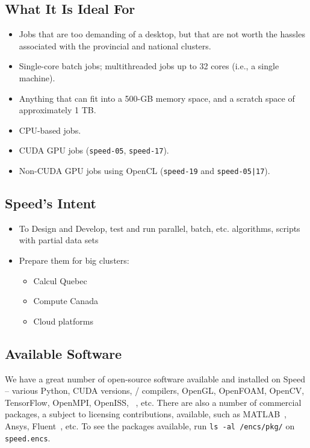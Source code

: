 \documentclass{easychair}
\begin{document}
\subsection{What It Is Ideal For}

\begin{itemize}
\item
Jobs that are too demanding of a desktop, but that are not worth the hassles associated with the provincial and national clusters. 
\item
Single-core batch jobs; multithreaded jobs up to 32 cores (i.e., a single machine).
\item
Anything that can fit into a 500-GB memory space, and a scratch space of approximately 1 TB. 
\item
CPU-based jobs. 
\item
CUDA GPU jobs (\texttt{speed-05}, \texttt{speed-17}).
\item
Non-CUDA GPU jobs using OpenCL (\texttt{speed-19} and \texttt{speed-05|17}).
\end{itemize}

\subsection{Speed's Intent}

\begin{itemize}
	\item 
To Design and Develop, test and run parallel, batch, etc. algorithms, scripts with partial data sets
	\item 
Prepare them for big clusters:
\begin{itemize}
	\item 
Calcul Quebec
	\item 
Compute Canada
	\item 
Cloud platforms
\end{itemize}
\end{itemize}

\subsection{Available Software}

We have a great number of open-source software available and installed
on Speed -- various Python, CUDA versions, {\cpp}/{\java} compilers, OpenGL,
OpenFOAM, OpenCV, TensorFlow, OpenMPI, OpenISS, {\marf}~\cite{marf}, etc.
There are also a number of commercial packages, a subject to licensing
contributions, available, such as MATLAB~\cite{matlab,scholarpedia-matlab}, Ansys, Fluent~\cite{fluent}, etc. To see the
packages available, run \texttt{ls -al /encs/pkg/} on \texttt{speed.encs}.
\end{document}

